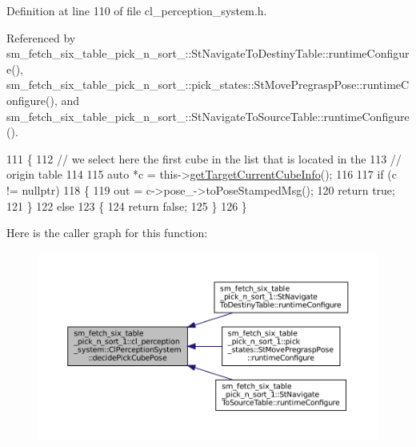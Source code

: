 Definition at line 110 of file cl\+\_\+perception\+\_\+system.\+h.



Referenced by sm\+\_\+fetch\+\_\+six\+\_\+table\+\_\+pick\+\_\+n\+\_\+sort\+\_\+::\+St\+Navigate\+To\+Destiny\+Table\+::runtime\+Configure(), sm\+\_\+fetch\+\_\+six\+\_\+table\+\_\+pick\+\_\+n\+\_\+sort\+\_\+::pick\+\_\+states\+::\+St\+Move\+Pregrasp\+Pose\+::runtime\+Configure(), and sm\+\_\+fetch\+\_\+six\+\_\+table\+\_\+pick\+\_\+n\+\_\+sort\+\_\+::\+St\+Navigate\+To\+Source\+Table\+::runtime\+Configure().


\begin{DoxyCode}
111             \{
112                 \textcolor{comment}{// we select here the first cube in the list that is located in the}
113                 \textcolor{comment}{// origin table}
114 
115                 \textcolor{keyword}{auto} *c = this->\hyperlink{classsm__fetch__six__table__pick__n__sort__1_1_1cl__perception__system_1_1ClPerceptionSystem_a4103ba8479b122c7af34b3b51102c5d5}{getTargetCurrentCubeInfo}();
116 
117                 \textcolor{keywordflow}{if} (c != \textcolor{keyword}{nullptr})
118                 \{
119                     out = c->pose\_->toPoseStampedMsg();
120                     \textcolor{keywordflow}{return} \textcolor{keyword}{true};
121                 \}
122                 \textcolor{keywordflow}{else}
123                 \{
124                     \textcolor{keywordflow}{return} \textcolor{keyword}{false};
125                 \}
126             \}
\end{DoxyCode}
Here is the caller graph for this function\+:
\nopagebreak
\begin{figure}[H]
\begin{center}
\leavevmode
\includegraphics[width=350pt]{classsm__fetch__six__table__pick__n__sort__1_1_1cl__perception__system_1_1ClPerceptionSystem_ada6bee3141c1a45d1b7a0a74b2d13a7a_icgraph}
\end{center}
\end{figure}

